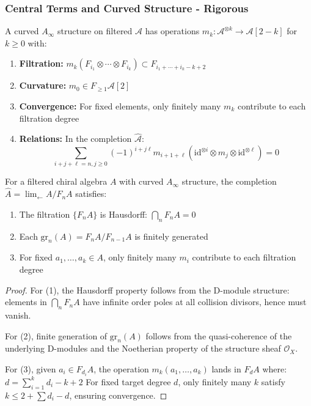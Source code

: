 \subsubsection{Central Terms and Curved Structure - Rigorous}

\begin{definition}
A curved $A_\infty$ structure on filtered $\mathcal{A}$ has operations $m_k: \mathcal{A}^{\otimes k} \to \mathcal{A}[2-k]$ for $k \geq 0$ with:
\begin{enumerate}
\item \textbf{Filtration:} $m_k(F_{i_1} \otimes \cdots \otimes F_{i_k}) \subset F_{i_1+\cdots+i_k-k+2}$
\item \textbf{Curvature:} $m_0 \in F_{\geq 1}\mathcal{A}[2]$
\item \textbf{Convergence:} For fixed elements, only finitely many $m_k$ contribute to each filtration degree
\item \textbf{Relations:} In the completion $\widehat{\mathcal{A}}$:
   $$\sum_{i+j+\ell=n, j \geq 0} (-1)^{i+j\ell} m_{i+1+\ell}(\text{id}^{\otimes i} \otimes m_j \otimes \text{id}^{\otimes \ell}) = 0$$
\end{enumerate}
\end{definition}

\begin{proposition}\label{prop:curved-convergence}
For a filtered chiral algebra $A$ with curved $A_\infty$ structure, the completion $\hat{A} = \lim_{\leftarrow} A/F_nA$ satisfies:
\begin{enumerate}
\item The filtration $\{F_nA\}$ is Hausdorff: $\bigcap_n F_nA = 0$
\item Each $\text{gr}_n(A) = F_nA/F_{n-1}A$ is finitely generated
\item For fixed $a_1, \ldots, a_k \in A$, only finitely many $m_i$ contribute to each filtration degree
\end{enumerate}
\end{proposition}

\begin{proof}
For (1), the Hausdorff property follows from the D-module structure: elements in $\bigcap_n F_nA$ have infinite order poles at all collision divisors, hence must vanish.

For (2), finite generation of $\text{gr}_n(A)$ follows from the quasi-coherence of the underlying D-modules and the Noetherian property of the structure sheaf $\mathcal{O}_X$.

For (3), given $a_i \in F_{d_i}A$, the operation $m_k(a_1, \ldots, a_k)$ lands in $F_d A$ where:
$d = \sum_{i=1}^k d_i - k + 2$
For fixed target degree $d$, only finitely many $k$ satisfy $k \leq 2 + \sum d_i - d$, ensuring convergence.
\end{proof}

